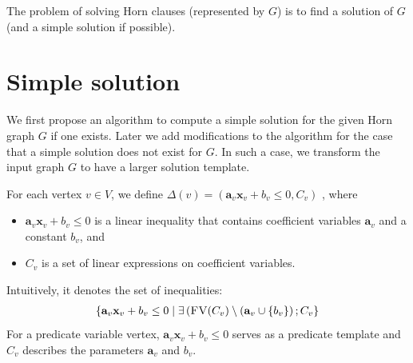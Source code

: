 The problem of solving Horn clauses (represented by $G$) is to find a
solution of $G$ (and a simple solution if possible).

\section{Simple solution}

We first propose an algorithm to compute a simple solution for the
given Horn graph $G$ if one exists.  Later we add modifications to the
algorithm for the case that a simple solution does not exist for $G$.
In such a case, we transform the input graph $G$ to have a larger
solution template.

For each vertex $v \in V$, we define
$\Delta(v) = (\mathbf{a}_v \mathbf{x}_v + b_v \leq 0, C_v)$
, where
\begin{itemize}
\item $\mathbf{a}_v \mathbf{x}_v + b_v \leq 0$ is a linear inequality
  that contains coefficient variables $\mathbf{a}_v$ and a constant
  $b_v$, and
\item $C_v$ is a set of linear expressions on coefficient variables.
\end{itemize}
Intuitively, it denotes the set of inequalities:
\begin{align*}
\left\lbrace
 \mathbf{a}_v \mathbf{x}_v + b_v \leq 0 \mid
 \exists \left( \textsc{FV}(C_v)
  \setminus (\mathbf{a}_v \cup \left\lbrace b_v \right\rbrace
 \right); C_v
\right\rbrace
\end{align*}
For a predicate variable vertex,
$\mathbf{a}_v \mathbf{x}_v + b_v \leq 0$ serves as a predicate
template and $C_v$ describes the parameters $\mathbf{a}_v$ and $b_v$.


